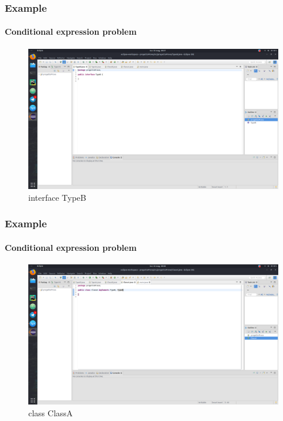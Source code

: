 \documentclass{beamer}
\begin{document}
\begin{frame}
\frametitle{Example}
\framesubtitle{Conditional expression problem}
\begin{figure}
\centering
\includegraphics[width=1\linewidth]{images/typeB}
\caption{ interface TypeB}
\label{fig:typeb}
\end{figure}
\end{frame}

\begin{frame}
\frametitle{Example}
\framesubtitle{Conditional expression problem}
\begin{figure}
\centering
\includegraphics[width=1\linewidth]{images/ClassA}
\caption{ class ClassA}
\label{fig:classa}
\end{figure}
\end{frame}
\end{document}
